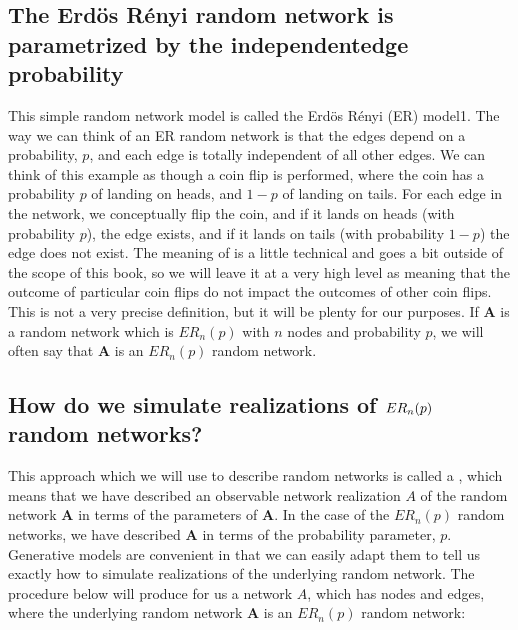 \documentclass[letterpaper,10pt,english]{jupyterBook}
\begin{document}
\subsection{The Erdös Rényi random network is parametrized by the independent\sphinxhyphen{}edge probability}
\label{\detokenize{representations/ch5/single-network-models_ER:the-erdos-renyi-random-network-is-parametrized-by-the-independent-edge-probability}}
\sphinxAtStartPar
This simple random network model is called the Erdös Rényi (ER) model1. The way we can think of an ER random network is that the edges depend  on a probability, \(p\), and each edge is totally independent of all other edges. We can think of this example as though a coin flip is performed, where the coin has a probability \(p\) of landing on heads, and \(1-p\) of landing on tails. For each edge in the network, we conceptually flip the coin, and if it lands on heads (with probability \(p\)), the edge exists, and if it lands on tails (with probability \(1-p\)) the edge does not exist. The meaning of  is a little technical and goes a bit outside of the scope of this book, so we will leave it at a very high level as meaning that the outcome of particular coin flips do not impact the outcomes of other coin flips. This is not a very precise definition, but it will be plenty for our purposes. If \(\mathbf A\) is a random network which is \(ER_n(p)\) with \(n\) nodes and probability \(p\), we will often say that \(\mathbf A\) is an \(ER_n(p)\) random network.


\subsection{How do we simulate realizations of \protect\(ER_n(p)\protect\) random networks?}
\label{\detokenize{representations/ch5/single-network-models_ER:how-do-we-simulate-realizations-of-er-n-p-random-networks}}
\sphinxAtStartPar
This approach which we will use to describe random networks is called a , which means that we have described an observable network realization \(A\) of the random network \(\mathbf A\) in terms of the parameters of \(\mathbf A\). In the case of the \(ER_n(p)\) random networks, we have described \(\mathbf A\) in terms of the probability parameter, \(p\). Generative models are convenient in that we can easily adapt them to tell us exactly how to simulate realizations of the underlying random network. The procedure below will produce for us a network \(A\), which has nodes and edges, where the underlying random network  \(\mathbf A\) is an \(ER_n(p)\) random network:
\end{document}
